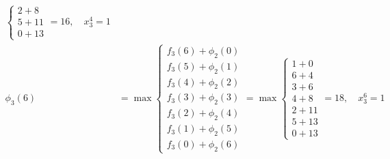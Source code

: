\documentclass{article}
\begin{document}
\[\begin{aligned}
\begin{cases}
                                                  2 + 8  \\
                                                  5 + 11 \\
                                                  0 + 13
                                              \end{cases} = 16, \quad x_3^4 = 1               \\
        \phi_3(6) & = \max \begin{cases}
                               f_3(6) + \phi_2(0) \\
                               f_3(5) + \phi_2(1) \\
                               f_3(4) + \phi_2(2) \\
                               f_3(3) + \phi_2(3) \\
                               f_3(2) + \phi_2(4) \\
                               f_3(1) + \phi_2(5) \\
                               f_3(0) + \phi_2(6)
                           \end{cases} = \max \begin{cases}
                                                  1 + 0  \\
                                                  6 + 4  \\
                                                  3 + 6  \\
                                                  4 + 8  \\
                                                  2 + 11 \\
                                                  5 + 13 \\
                                                  0 + 13
                                              \end{cases} = 18, \quad x_3^6 = 1               \\
    \end{aligned}
\]
\end{document}
